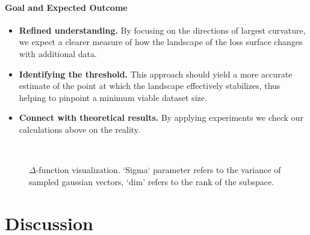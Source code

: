 \documentclass{article}
\begin{document}
\paragraph{Goal and Expected Outcome}
\begin{itemize}
  \item \textbf{Refined understanding.} By focusing on the directions of largest curvature, we expect a clearer
        measure of how the landscape of the loss surface changes with additional data.
  \item \textbf{Identifying the threshold.} This approach should yield a more accurate estimate of the point at which the
        landscape effectively stabilizes, thus helping to pinpoint a minimum viable dataset size.
  \item \textbf{Connect with theoretical results.} By applying experiments we check our calculations above on the reality.
\end{itemize}





\begin{figure}[!htbp]
  \hspace*{-0.7cm}
  \\
  \caption{$\Delta$-function visualization. `Sigma` parameter refers to the variance of sampled gaussian vectors, `dim' 
  refers to the rank of the subspace.}
  \label{fig:base_delta}
\end{figure}



\section{Discussion}\label{sec:disc}
\end{document}
